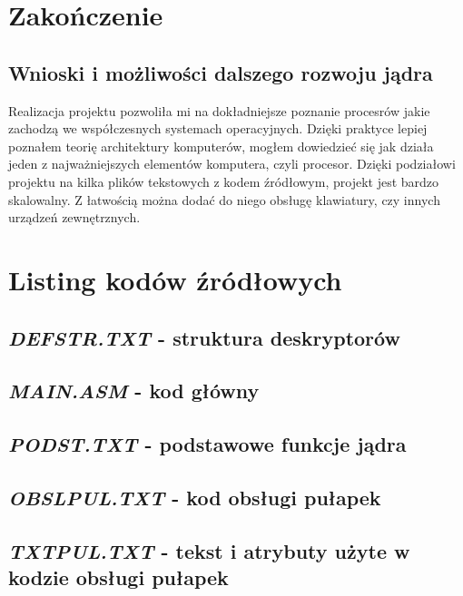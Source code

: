 \documentclass[a4paper,12pt]{article}
\begin{document}
	\section{Zakończenie}
\subsection{Wnioski i możliwości dalszego rozwoju jądra}
Realizacja projektu pozwoliła mi na dokładniejsze poznanie procesrów jakie zachodzą we współczesnych systemach operacyjnych. Dzięki praktyce lepiej poznałem teorię architektury komputerów, mogłem dowiedzieć się jak działa jeden z najważniejszych elementów komputera, czyli procesor. Dzięki podziałowi projektu na kilka plików tekstowych z kodem źródłowym, projekt jest bardzo skalowalny. Z łatwością można dodać do niego obsługę klawiatury, czy innych urządzeń zewnętrznych.

\section{Listing kodów źródłowych}


\subsection{\textit{DEFSTR.TXT} - struktura deskryptorów}


\subsection{\textit{MAIN.ASM} - kod główny}


\subsection{\textit{PODST.TXT} - podstawowe funkcje jądra}


\subsection{\textit{OBSLPUL.TXT} - kod obsługi pułapek}


\subsection{\textit{TXTPUL.TXT} - tekst i atrybuty użyte w kodzie obsługi pułapek}

\end{document}
